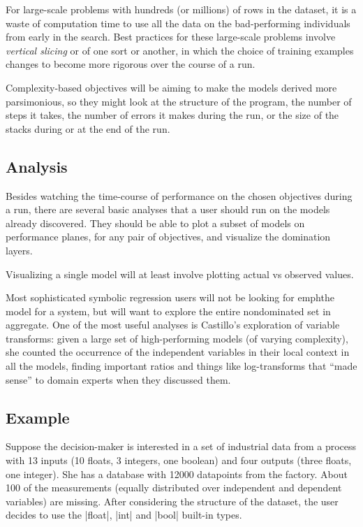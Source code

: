 \documentclass[12pt]{article}
\begin{document}
For large-scale problems with hundreds (or millions) of rows in the dataset, it is a waste of computation time to use all the data on the bad-performing individuals from early in the search. Best practices for these large-scale problems involve \emph{vertical slicing} or \emph{} of one sort or another, in which the choice of training examples changes to become more rigorous over the course of a run.

Complexity-based objectives will be aiming to make the models derived more parsimonious, so they might look at the structure of the program, the number of steps it takes, the number of errors it makes during the run, or the size of the stacks during or at the end of the run.

\subsection{Analysis}

Besides watching the time-course of performance on the chosen objectives during a run, there are several basic analyses that a user should run on the models already discovered. They should be able to plot a subset of models on performance planes, for any pair of objectives, and visualize the domination layers. 

Visualizing a single model will at least involve plotting actual vs observed values.

Most sophisticated symbolic regression users will not be looking for emph{the} model for a system, but will want to explore the entire nondominated set in aggregate. One of the most useful analyses is Castillo's exploration of variable transforms: given a large set of high-performing models (of varying complexity), she counted the occurrence of the independent variables in their local context in all the models, finding important ratios and things like log-transforms that ``made sense'' to domain experts when they discussed them.

\subsection{Example}

Suppose the decision-maker is interested in a set of industrial data from a process with 13 inputs (10 floats, 3 integers, one boolean) and four outputs (three floats, one integer). She has a database with 12000 datapoints from the factory. About 100 of the measurements (equally distributed over independent and dependent variables) are missing. After considering the structure of the dataset, the user decides to use the |float|, |int| and |bool| built-in types.
\end{document}
